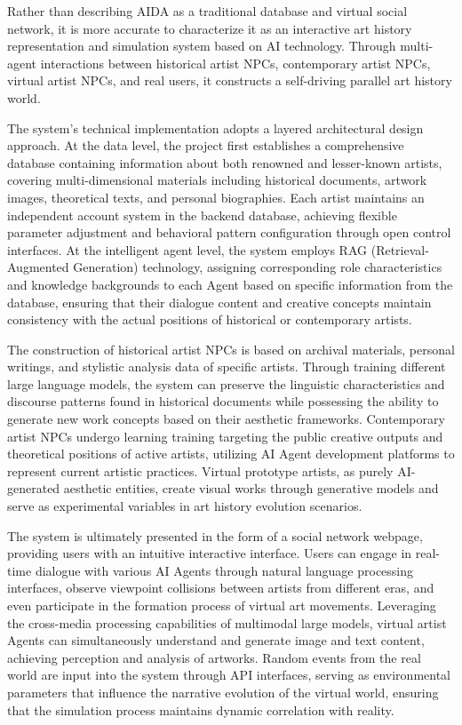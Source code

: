 \documentclass{article}
\begin{document}
Rather than describing AIDA as a traditional database and virtual social network, it is more accurate to characterize it as an interactive art history representation and simulation system based on AI technology. Through multi-agent interactions between historical artist NPCs, contemporary artist NPCs, virtual artist NPCs, and real users, it constructs a self-driving parallel art history world.

The system's technical implementation adopts a layered architectural design approach. At the data level, the project first establishes a comprehensive database containing information about both renowned and lesser-known artists, covering multi-dimensional materials including historical documents, artwork images, theoretical texts, and personal biographies. Each artist maintains an independent account system in the backend database, achieving flexible parameter adjustment and behavioral pattern configuration through open control interfaces. At the intelligent agent level, the system employs RAG (Retrieval-Augmented Generation) technology, assigning corresponding role characteristics and knowledge backgrounds to each Agent based on specific information from the database, ensuring that their dialogue content and creative concepts maintain consistency with the actual positions of historical or contemporary artists.

The construction of historical artist NPCs is based on archival materials, personal writings, and stylistic analysis data of specific artists. Through training different large language models, the system can preserve the linguistic characteristics and discourse patterns found in historical documents while possessing the ability to generate new work concepts based on their aesthetic frameworks. Contemporary artist NPCs undergo learning training targeting the public creative outputs and theoretical positions of active artists, utilizing AI Agent development platforms to represent current artistic practices. Virtual prototype artists, as purely AI-generated aesthetic entities, create visual works through generative models and serve as experimental variables in art history evolution scenarios.

The system is ultimately presented in the form of a social network webpage, providing users with an intuitive interactive interface. Users can engage in real-time dialogue with various AI Agents through natural language processing interfaces, observe viewpoint collisions between artists from different eras, and even participate in the formation process of virtual art movements. Leveraging the cross-media processing capabilities of multimodal large models, virtual artist Agents can simultaneously understand and generate image and text content, achieving perception and analysis of artworks. Random events from the real world are input into the system through API interfaces, serving as environmental parameters that influence the narrative evolution of the virtual world, ensuring that the simulation process maintains dynamic correlation with reality.
\end{document}
